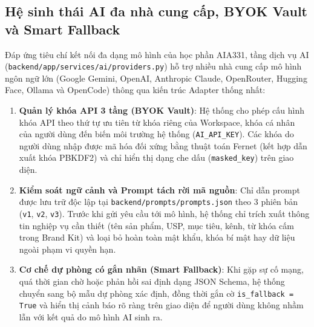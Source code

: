 \subsection{Hệ sinh thái AI đa nhà cung cấp, BYOK Vault và Smart Fallback}
Đáp ứng tiêu chí kết nối đa dạng mô hình của học phần AIA331, tầng dịch vụ AI (\texttt{backend/\allowbreak app/\allowbreak services/\allowbreak ai/\allowbreak providers.py}) hỗ trợ nhiều nhà cung cấp mô hình ngôn ngữ lớn (Google Gemini, OpenAI, Anthropic Claude, OpenRouter, Hugging Face, Ollama và OpenCode) thông qua kiến trúc Adapter thống nhất:
\begin{enumerate}
  \item \textbf{Quản lý khóa API 3 tầng (BYOK Vault)}: Hệ thống cho phép cấu hình khóa API theo thứ tự ưu tiên từ khóa riêng của Workspace, khóa cá nhân của người dùng đến biến môi trường hệ thống (\texttt{AI\_API\_KEY}). Các khóa do người dùng nhập được mã hóa đối xứng bằng thuật toán Fernet (kết hợp dẫn xuất khóa PBKDF2) và chỉ hiển thị dạng che dấu (\texttt{masked\_key}) trên giao diện.
  \item \textbf{Kiểm soát ngữ cảnh và Prompt tách rời mã nguồn}: Chỉ dẫn prompt được lưu trữ độc lập tại \texttt{backend/\allowbreak prompts/\allowbreak prompts.json} theo 3 phiên bản (\texttt{v1}, \texttt{v2}, \texttt{v3}). Trước khi gửi yêu cầu tới mô hình, hệ thống chỉ trích xuất thông tin nghiệp vụ cần thiết (tên sản phẩm, USP, mục tiêu, kênh, từ khóa cấm trong Brand Kit) và loại bỏ hoàn toàn mật khẩu, khóa bí mật hay dữ liệu ngoài phạm vi quyền hạn.
  \item \textbf{Cơ chế dự phòng có gắn nhãn (Smart Fallback)}: Khi gặp sự cố mạng, quá thời gian chờ hoặc phản hồi sai định dạng JSON Schema, hệ thống chuyển sang bộ mẫu dự phòng xác định, đồng thời gắn cờ \texttt{is\_fallback = True} và hiển thị cảnh báo rõ ràng trên giao diện để người dùng không nhầm lẫn với kết quả do mô hình AI sinh ra.
\end{enumerate}

